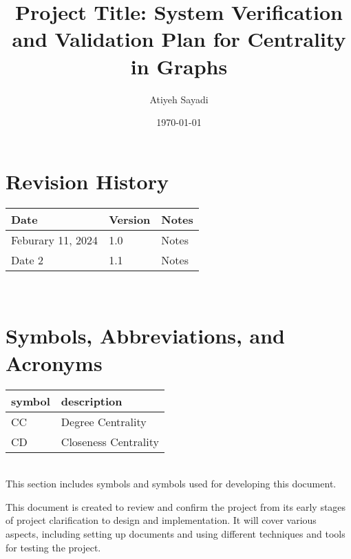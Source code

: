\documentclass[12pt, titlepage]{article}
\begin{document}
\title{Project Title: System Verification and Validation Plan for Centrality in Graphs{}} 
\author{Atiyeh Sayadi}
\date{\today}
	
\maketitle


\section*{Revision History}

\begin{tabularx}{\textwidth}{p{3cm}p{2cm}X}
\toprule {\bf Date} & {\bf Version} & {\bf Notes}\\
\midrule
Feburary 11, 2024 & 1.0 & Notes\\
Date 2 & 1.1 & Notes\\
\bottomrule
\end{tabularx}

~\\


\newpage

\tableofcontents

\listoftables
{}

\listoffigures
{}

\newpage

\section{Symbols, Abbreviations, and Acronyms}

\renewcommand{\arraystretch}{1.2}
\begin{tabular}{l l} 
  \toprule		
  \textbf{symbol} & \textbf{description}\\
  \midrule 
  CC& Degree Centrality \\
  CD& Closeness Centrality  \\
  \bottomrule
\end{tabular}\\

This section includes symbols and symbols used for developing this document.


\newpage



This document is created to review and confirm the project from its early stages of project clarification to design and implementation. It will cover various aspects, including setting up documents and using different techniques and tools for testing the project.
\end{document}
